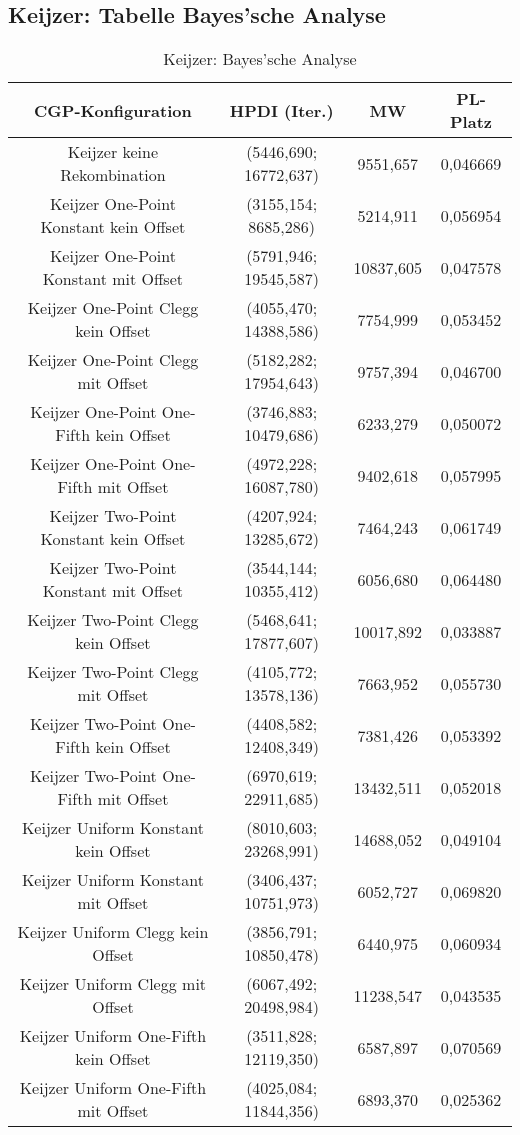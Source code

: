 \subsection{Keijzer: Tabelle Bayes'sche Analyse}
\label{subsec:appendixTabelleBayesKeijzer}

\begin{table}[H]
	\centering
	\begin{tabular}{c | c | c | c}
		\textbf{CGP-Konfiguration} & \textbf{HPDI (Iter.)} & \textbf{MW} & \textbf{PL-Platz}\\
		\hline
		Keijzer keine Rekombination & (5446,690; 16772,637) & 9551,657 & 0,046669\\
		\hline
		Keijzer One-Point Konstant kein Offset & (3155,154; 8685,286) & 5214,911 & 0,056954\\
		\hline
		Keijzer One-Point Konstant mit Offset & (5791,946; 19545,587) & 10837,605 & 0,047578\\
		\hline
		Keijzer One-Point Clegg kein Offset & (4055,470; 14388,586) & 7754,999 & 0,053452\\
		\hline
		Keijzer One-Point Clegg mit Offset & (5182,282; 17954,643) & 9757,394 & 0,046700\\
		\hline
		Keijzer One-Point One-Fifth kein Offset & (3746,883; 10479,686) & 6233,279 & 0,050072\\
		\hline
		Keijzer One-Point One-Fifth mit Offset & (4972,228; 16087,780) & 9402,618 & 0,057995\\
		\hline
		Keijzer Two-Point Konstant kein Offset & (4207,924; 13285,672) & 7464,243 & 0,061749\\
		\hline
		Keijzer Two-Point Konstant mit Offset & (3544,144; 10355,412) & 6056,680 & 0,064480\\
		\hline
		Keijzer Two-Point Clegg kein Offset & (5468,641; 17877,607) & 10017,892 & 0,033887\\
		\hline
		Keijzer Two-Point Clegg mit Offset & (4105,772; 13578,136) & 7663,952 & 0,055730\\
		\hline
		Keijzer Two-Point One-Fifth kein Offset & (4408,582; 12408,349) & 7381,426 & 0,053392\\
		\hline
		Keijzer Two-Point One-Fifth mit Offset & (6970,619; 22911,685) & 13432,511 & 0,052018\\
		\hline
		Keijzer Uniform Konstant kein Offset & (8010,603; 23268,991) & 14688,052 & 0,049104\\
		\hline
		Keijzer Uniform Konstant mit Offset & (3406,437; 10751,973) & 6052,727 & 0,069820\\
		\hline
		Keijzer Uniform Clegg kein Offset & (3856,791; 10850,478) & 6440,975 & 0,060934\\
		\hline
		Keijzer Uniform Clegg mit Offset & (6067,492; 20498,984) & 11238,547 & 0,043535\\
		\hline
		Keijzer Uniform One-Fifth kein Offset & (3511,828; 12119,350) & 6587,897 & 0,070569\\
		\hline
		Keijzer Uniform One-Fifth mit Offset & (4025,084; 11844,356) & 6893,370 & 0,025362\\
	\end{tabular}
	\label{table:keijzerBayesian}
	\caption{Keijzer: Bayes'sche Analyse}
\end{table}


